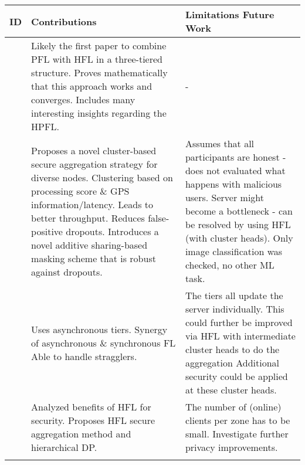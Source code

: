 \begin{changemargin}{-2cm}{0cm} 
    \begin{tabular}{|c||m{0.4\paperwidth}|m{0.4\paperwidth}|}
        \hline
            ID & Contributions & Limitations Future Work \\
        \hline
            \cite{HPFL_over_massive_mobile_edge_computing_networks}
            & 
            Likely the first paper to combine PFL with HFL in a three-tiered structure.
            Proves mathematically that this approach works and converges.
            Includes many interesting insights regarding the HPFL.
            &
            -
        \\
        \hline
            \cite{paper:cluster_based_secure_aggregation_for_fl}
            &
            Proposes a novel cluster-based secure aggregation strategy for diverse nodes.
            Clustering based on processing score \& GPS information/latency.
            Leads to better throughput.
            Reduces false-positive dropouts.
            Introduces a novel additive sharing-based masking scheme that is robust against dropouts.
            &
            Assumes that all participants are honest - does not evaluated what happens with malicious users.
            Server might become a bottleneck - can be resolved by using HFL (with cluster heads).
            Only image classification was checked, no other ML task.
        \\
        \hline
            \cite{paper:fedat_high_performance_communication_efficient_fl_with_asynch_tiers}
            &
            Uses asynchronous tiers.
            Synergy of asynchronous \& synchronous FL
            Able to handle stragglers.
            &
            The tiers all update the server individually.
            This could further be improved via HFL with intermediate cluster heads to do the aggregation
            Additional security could be applied at these cluster heads.
        \\
        \hline
            \cite{paper:hfl_with_privacy}
            &
            Analyzed benefits of HFL for security.
            Proposes HFL secure aggregation method
            and hierarchical DP.
            &
            The number of (online) clients per zone has to be small.
            Investigate further privacy improvements.
        \\
        \hline
            \cite{paper:edge_fl_via_mqtt_and_oma_lightweight_m2m}

\end{tabular}
\end{changemargin}
